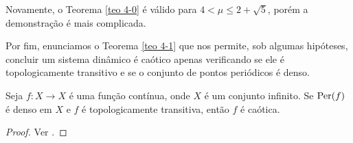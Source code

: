 Novamente, o Teorema \ref{teo 4-0} é válido para $4 < \mu \leq 2 + \sqrt{5}$, porém a demonstração é mais complicada.

Por fim, enunciamos o Teorema \ref{teo 4-1} que nos permite, sob algumas hipóteses, concluir um sistema dinâmico é caótico apenas verificando se ele é topologicamente transitivo e se o conjunto de pontos periódicos é denso.

\begin{theorem}\label{teo 4-1}
Seja $f: X \to X$ é uma função contínua, onde $X$ é um conjunto infinito. Se $\operatorname{Per}(f)$ é denso em $X$ e $f$ é topologicamente transitiva, então $f$ é caótica.
\end{theorem}

\begin{proof}
Ver \cite{holmgren}.
\end{proof}
